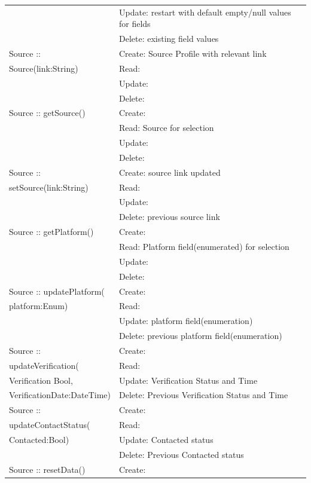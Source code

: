 \begin{longtable}{|p{.3\linewidth}|p{.7\linewidth}|}
               & Update: restart with default empty/null values for fields\\
               & Delete: existing field values\\ \hline
    Source ::  & Create: Source Profile with relevant link \\
    Source(link:String) & Read: \\
               & Update: \\
               & Delete: \\ \hline
    Source :: getSource() & Create:  \\
                & Read: Source for selection\\
               & Update: \\
               & Delete: \\ \hline
    Source :: & Create: source link updated \\
    setSource(link:String) & Read: \\
               & Update: \\
               & Delete: previous source link \\ \hline
    Source :: getPlatform() & Create:  \\
                & Read: Platform field(enumerated) for selection\\
               & Update: \\
               & Delete: \\ \hline
    Source ::  updatePlatform( & Create:  \\
    platform:Enum) & Read: \\
               & Update: platform field(enumeration)\\
               & Delete: previous platform field(enumeration)\\ \hline
    Source :: & Create:  \\
    updateVerification( & Read: \\
    Verification Bool, & Update: Verification Status and Time \\
    VerificationDate:DateTime) & Delete: Previous Verification Status and Time \\ \hline
    Source :: & Create:  \\
    updateContactStatus( & Read: \\
    Contacted:Bool) & Update: Contacted status \\
               & Delete: Previous Contacted status\\ \hline
    Source :: resetData() & Create:  \\

\end{longtable}

